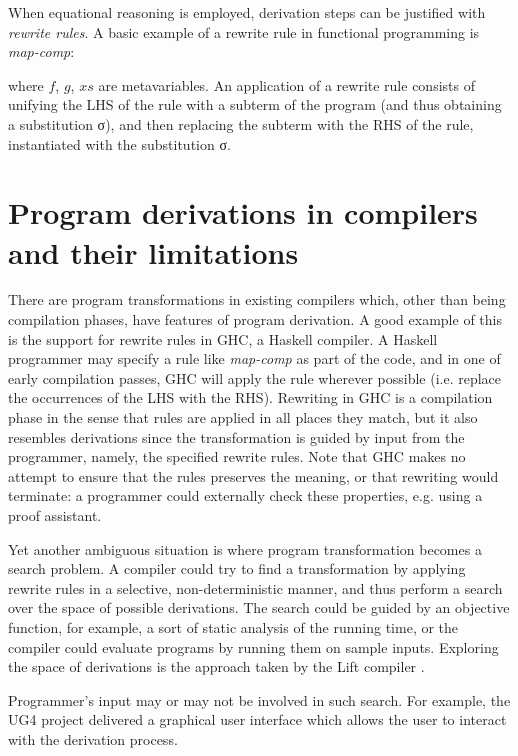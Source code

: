 \documentclass[bsc,frontabs,oneside,singlespacing,parskip,deptreport]{infthesis}
\theoremstyle{definition}
\theoremstyle{lemma}
\begin{document}
When equational reasoning is employed, derivation steps can be
justified with \textit{rewrite rules}. A basic example of a rewrite
rule in functional programming is \textit{map-comp}:


where $f$, $g$, $xs$ are metavariables. An application of a rewrite
rule consists of unifying the LHS of the rule with a subterm of the
program (and thus obtaining a substitution σ), and then replacing the
subterm with the RHS of the rule, instantiated with the substitution
σ.

\section{Program derivations in compilers and their limitations}
\label{sec:progr-deriv-comp}

There are program transformations in existing compilers which, other
than being compilation phases, have features of program derivation.  A
good example of this is the support for rewrite rules in GHC, a
Haskell compiler. A Haskell programmer may specify a rule like
\textit{map-comp} as part of the code, and in one of early compilation
passes, GHC will apply the rule wherever possible (i.e. replace the
occurrences of the LHS with the RHS). Rewriting in GHC is a
compilation phase in the sense that rules are applied in all places
they match, but it also resembles derivations since the transformation
is guided by input from the programmer, namely, the specified rewrite
rules. Note that GHC makes no attempt to ensure that the rules
preserves the meaning, or that rewriting would terminate: a programmer
could externally check these properties, e.g. using a proof
assistant.

Yet another ambiguous situation is where program transformation
becomes a search problem. A compiler could try to find a
transformation by applying rewrite rules in a selective,
non-deterministic manner, and thus perform a search over the space of
possible derivations. The search could be guided by an objective
function, for example, a sort of static analysis of the running time,
or the compiler could evaluate programs by running them on sample
inputs. Exploring the space of derivations is the approach taken by
the Lift compiler \cite{DBLP:conf/cgo/SteuwerRD17}.

Programmer's input may or may not be involved in such search. For
example, the UG4 project delivered a graphical user interface which
allows the user to interact with the derivation process.
\end{document}

